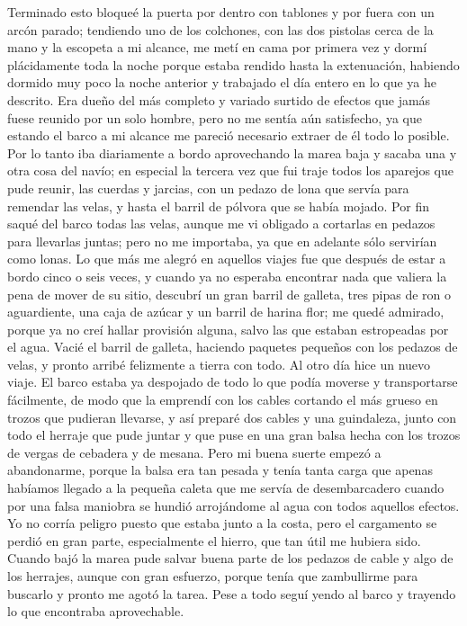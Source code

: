 \documentclass{novela}
\begin{document}
    Terminado esto bloqueé la puerta por dentro con tablones y por fuera con un arcón parado; tendiendo uno de los colchones, con las dos pistolas cerca de la mano y la escopeta a mi alcance, me metí en cama por primera vez y dormí plácidamente toda la noche porque estaba rendido hasta la extenuación, habiendo dormido muy poco la noche anterior y trabajado el día entero en lo que ya he descrito.
    Era dueño del más completo y variado surtido de efectos que jamás fuese reunido por un solo hombre, pero no me sentía aún satisfecho, ya que estando el barco a mi alcance me pareció necesario extraer de él todo lo posible. Por lo tanto iba diariamente a bordo aprovechando la marea baja y sacaba una y otra cosa del navío; en especial la tercera vez que fui traje todos los aparejos que pude reunir, las cuerdas y jarcias, con un pedazo de lona que servía para remendar las velas, y hasta el barril de pólvora que se había mojado. Por fin saqué del barco todas las velas, aunque me vi obligado a cortarlas en pedazos para llevarlas juntas; pero no me importaba, ya que en adelante sólo servirían como lonas.
    Lo que más me alegró en aquellos viajes fue que después de estar a bordo cinco o seis veces, y cuando ya no esperaba encontrar nada que valiera la pena de mover de su sitio, descubrí un gran barril de galleta, tres pipas de ron o aguardiente, una caja de azúcar y un barril de harina flor; me quedé admirado, porque ya no creí hallar provisión alguna, salvo las que estaban estropeadas por el agua. Vacié el barril de galleta, haciendo paquetes pequeños con los pedazos de velas, y pronto arribé felizmente a tierra con todo.
    Al otro día hice un nuevo viaje. El barco estaba ya despojado de todo lo que podía moverse y transportarse fácilmente, de modo que la emprendí con los cables cortando el más grueso en trozos que pudieran llevarse, y así preparé dos cables y una guindaleza, junto con todo el herraje que pude juntar y que puse en una gran balsa hecha con los trozos de vergas de cebadera y de mesana. Pero mi buena suerte empezó a abandonarme, porque la balsa era tan pesada y tenía tanta carga que apenas habíamos llegado a la pequeña caleta que me servía de desembarcadero cuando por una falsa maniobra se hundió arrojándome al agua con todos aquellos efectos. Yo no corría peligro puesto que estaba junto a la costa, pero el cargamento se perdió en gran parte, especialmente el hierro, que tan útil me hubiera sido. Cuando bajó la marea pude salvar buena parte de los pedazos de cable y algo de los herrajes, aunque con gran esfuerzo, porque tenía que zambullirme para buscarlo y pronto me agotó la tarea. Pese a todo seguí yendo al barco y trayendo lo que encontraba aprovechable.
\end{document}
